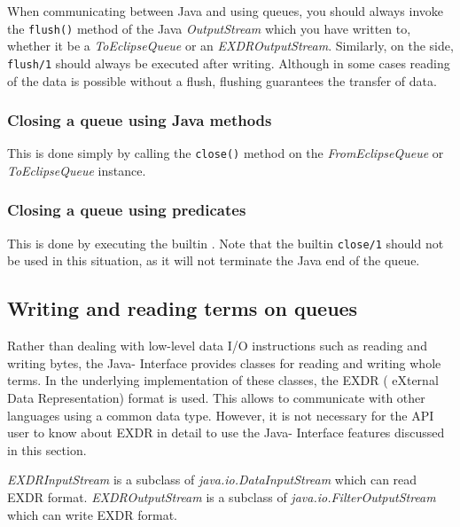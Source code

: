When communicating between Java and {\eclipse} using queues, you
should always invoke the {\tt flush()} method of the Java {\it
OutputStream} which you have written to, whether it be a {\it
ToEclipseQueue} or an {\it EXDROutputStream}. Similarly, on the
{\eclipse} side, {\tt flush/1} should always be executed after
writing. Although in some cases reading of the data is possible
without a flush, flushing guarantees the transfer of data.

\subsubsection*{Closing a queue using Java methods}

This is done simply by calling the {\tt close()} method on the {\it
FromEclipseQueue} or {\it ToEclipseQueue} instance.

\subsubsection*{Closing a queue using {\eclipse} predicates}
This is done by executing the builtin . Note
that the builtin {\tt close/1} should not be used in this situation,
as it will not terminate the Java end of the queue.

\subsection{Writing and reading {\eclipse} terms on queues}
\label{sec:ji-formatting-queue-data}
Rather than dealing with low-level data I/O instructions such as reading
and writing bytes, the Java-{\eclipse} Interface provides classes for
reading and writing whole terms. In the underlying implementation of these
classes, the EXDR ({\eclipse} eXternal Data Representation) format is
used. This allows {\eclipse} to communicate with other
languages using a common data type. However, it is not necessary for the
API user to know about EXDR in detail to use the Java-{\eclipse} Interface
features discussed in this section.

{\it EXDRInputStream} is a subclass of {\it
java.io.DataInputStream} which can read EXDR format. {\it
EXDROutputStream} is a subclass of {\it
java.io.FilterOutputStream} which can write EXDR format.

